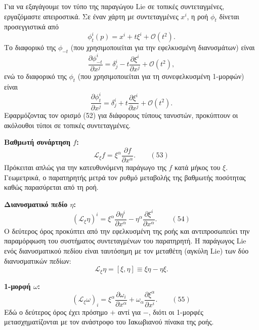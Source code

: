 \documentclass[12pt]{article}
\begin{document}
Για να εξαγάγουμε τον τύπο της παραγώγου Lie σε τοπικές συντεταγμένες, εργαζόμαστε απειροστικά. Σε έναν χάρτη με συντεταγμένες $x^i$, η ροή $\phi_t$ δίνεται προσεγγιστικά από
\[
\phi_t^i(p) = x^i + t \xi^i + \mathcal{O}(t^2).
\]
Το διαφορικό της $\phi_{-t}$ (που χρησιμοποιείται για την εφελκυσμένη διανυσμάτων) είναι
\[
\frac{\partial \phi_{-t}^i}{\partial x^j} = \delta^i_j - t \frac{\partial \xi^i}{\partial x^j} + \mathcal{O}(t^2),
\]
ενώ το διαφορικό της $\phi_t$ (που χρησιμοποιείται για τη συνεφελκυσμένη 1-μορφών) είναι
\[
\frac{\partial \phi_t^i}{\partial x^j} = \delta^i_j + t \frac{\partial \xi^i}{\partial x^j} + \mathcal{O}(t^2).
\]
Εφαρμόζοντας τον ορισμό (52) για διάφορους τύπους τανυστών, προκύπτουν οι ακόλουθοι τύποι σε τοπικές συντεταγμένες.

\textbf{Βαθμωτή συνάρτηση $f$:}
\begin{equation}
\mathcal{L}_\xi f = \xi^\alpha \frac{\partial f}{\partial x^\alpha}. \qquad (53)
\end{equation}
Πρόκειται απλώς για την κατευθυνόμενη παράγωγο της $f$ κατά μήκος του $\xi$. Γεωμετρικά, ο παρατηρητής μετρά τον ρυθμό μεταβολής της βαθμωτής ποσότητας καθώς παρασύρεται από τη ροή.

\textbf{Διανυσματικό πεδίο $\eta$:}
\begin{equation}
(\mathcal{L}_\xi \eta)^i = \xi^\alpha \frac{\partial \eta^i}{\partial x^\alpha} - \eta^\alpha \frac{\partial \xi^i}{\partial x^\alpha}. \qquad (54)
\end{equation}
Ο δεύτερος όρος προκύπτει από την εφελκυσμένη της ροής και αντιπροσωπεύει την παραμόρφωση του συστήματος συντεταγμένων του παρατηρητή. Η παράγωγος Lie ενός διανυσματικού πεδίου είναι ταυτόσημη με τον μεταθέτη (αγκύλη Lie) των δύο διανυσματικών πεδίων:
\[
\mathcal{L}_\xi \eta = [\xi, \eta] \equiv \xi \eta - \eta \xi.
\]

\textbf{1-μορφή $\omega$:}
\begin{equation}
(\mathcal{L}_\xi \omega)_i = \xi^\alpha \frac{\partial \omega_i}{\partial x^\alpha} + \omega_\alpha \frac{\partial \xi^\alpha}{\partial x^i}. \qquad (55)
\end{equation}
Εδώ ο δεύτερος όρος έχει πρόσημο $+$ αντί για $-$, διότι οι 1-μορφές μετασχηματίζονται με τον ανάστροφο του Ιακωβιανού πίνακα της ροής.
\end{document}
